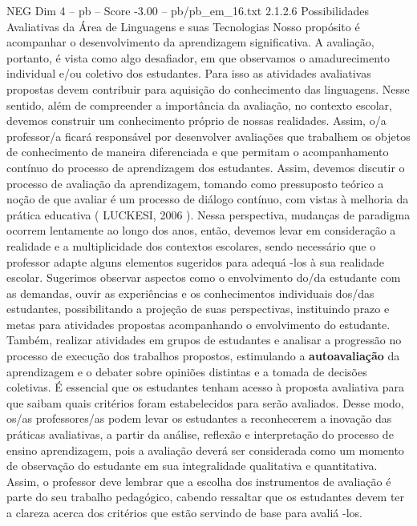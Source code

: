 \begin{textsample}{NEG Dim 4 – pb – Score -3.00 – pb/pb\_em\_16.txt}  \label{ex:f4_neg_024}
2.1.2.6 Possibilidades Avaliativas da Área de Linguagens e suas Tecnologias Nosso propósito é acompanhar o desenvolvimento da aprendizagem significativa.
A avaliação, portanto, é vista como algo desafiador, em que observamos o amadurecimento individual e/ou coletivo dos estudantes.
Para isso as atividades avaliativas propostas devem contribuir para aquisição do conhecimento das linguagens.
Nesse sentido, além de compreender a importância da avaliação, no contexto escolar, devemos construir um conhecimento próprio de nossas realidades.
Assim, o/a professor/a ficará responsável por desenvolver avaliações que trabalhem os objetos de conhecimento de maneira diferenciada e que permitam o acompanhamento contínuo do processo de aprendizagem dos estudantes.
Assim, devemos discutir o processo de avaliação da aprendizagem, tomando como pressuposto teórico a noção de que avaliar é um processo de diálogo contínuo, com vistas à melhoria da prática educativa ( LUCKESI, 2006 ).
Nessa perspectiva, mudanças de paradigma ocorrem lentamente ao longo dos anos, então, devemos levar em consideração a realidade e a multiplicidade dos contextos escolares, sendo necessário que o professor adapte alguns elementos sugeridos para adequá -los à sua realidade escolar.
Sugerimos observar aspectos como o envolvimento do/da estudante com as demandas, ouvir as experiências e os conhecimentos individuais dos/das estudantes, possibilitando a projeção de suas perspectivas, instituindo prazo e metas para atividades propostas acompanhando o envolvimento do estudante.
Também, realizar atividades em grupos de estudantes e analisar a progressão no processo de execução dos trabalhos propostos, estimulando a \textbf{autoavaliação} da aprendizagem e o debater sobre opiniões distintas e a tomada de decisões coletivas.
É essencial que os estudantes tenham acesso à proposta avaliativa para que saibam quais critérios foram estabelecidos para serão avaliados.
Desse modo, os/as professores/as podem levar os estudantes a reconhecerem a inovação das práticas avaliativas, a partir da análise, reflexão e interpretação do processo de ensino aprendizagem, pois a avaliação deverá ser considerada como um momento de observação do estudante em sua integralidade qualitativa e quantitativa.
Assim, o professor deve lembrar que a escolha dos instrumentos de avaliação é parte do seu trabalho pedagógico, cabendo ressaltar que os estudantes devem ter a clareza acerca dos critérios que estão servindo de base para avaliá -los.

\end{textsample}
